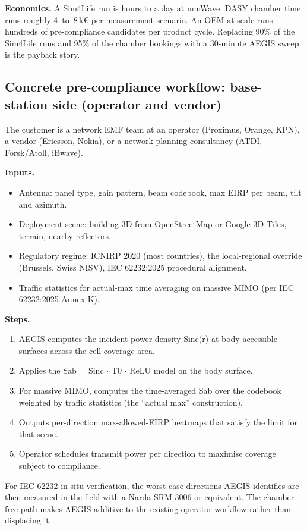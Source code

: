 \documentclass[11pt,a4paper]{article}
\begin{document}
\textbf{Economics.} A Sim4Life run is hours to a day at mmWave. DASY chamber time runs roughly
\hbox{4 to 8\,k\euro{}} per measurement scenario. An OEM at scale runs hundreds of pre-compliance
candidates per product cycle. Replacing 90\% of the Sim4Life runs and 95\% of the chamber bookings with a
30-minute AEGIS sweep is the payback story.

\subsection*{Concrete pre-compliance workflow: base-station side (operator and vendor)}
The customer is a network EMF team at an operator (Proximus, Orange, KPN), a vendor (Ericsson, Nokia), or
a network planning consultancy (ATDI, Forsk/Atoll, iBwave).

\textbf{Inputs.}
\begin{itemize}
  \item Antenna: panel type, gain pattern, beam codebook, max EIRP per beam, tilt and azimuth.
  \item Deployment scene: building 3D from OpenStreetMap or Google 3D Tiles, terrain, nearby reflectors.
  \item Regulatory regime: ICNIRP 2020 (most countries), the local-regional override (Brussels, Swiss NISV), IEC 62232:2025 procedural alignment.
  \item Traffic statistics for actual-max time averaging on massive MIMO (per IEC 62232:2025 Annex K).
\end{itemize}

\textbf{Steps.}
\begin{enumerate}
  \item AEGIS computes the incident power density Sinc(r) at body-accessible surfaces across the cell coverage area.
  \item Applies the Sab = Sinc $\cdot$ T0 $\cdot$ ReLU model on the body surface.
  \item For massive MIMO, computes the time-averaged Sab over the codebook weighted by traffic statistics (the ``actual max'' construction).
  \item Outputs per-direction max-allowed-EIRP heatmaps that satisfy the limit for that scene.
  \item Operator schedules transmit power per direction to maximise coverage subject to compliance.
\end{enumerate}

For IEC 62232 in-situ verification, the worst-case directions AEGIS identifies are then measured in the
field with a Narda SRM-3006 or equivalent. The chamber-free path makes AEGIS additive to the existing
operator workflow rather than displacing it.
\end{document}
